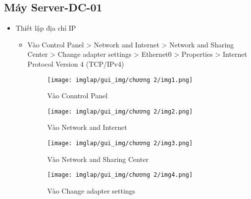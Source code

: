 \documentclass[13pt]{article}
\begin{document}
            \subsection{Máy Server-DC-01}
                \begin{itemize}
                    \item Thiết lập địa chỉ IP
                        \begin{itemize}
                            \item Vào Control Panel > Network and Internet > Network and Sharing Center > Change adapter settings > Ethernet0 > Properties > Internet Protocol Version 4 (TCP/IPv4)

                            \begin{figure}[H]
                                \centering
                                \texttt{[image: imglap/gui\_img/chương 2/img1.png]}
                                \caption{Vào Conntrol Panel}
                                \label{fig:enter-labe}
                            \end{figure}

                            \begin{figure}[H]
                                \centering
                                \texttt{[image: imglap/gui\_img/chương 2/img2.png]}
                                \caption{Vào Network and Internet}
                                \label{fig:enter-label}
                            \end{figure}

                            \begin{figure}[H]
                                \centering
                                \texttt{[image: imglap/gui\_img/chương 2/img3.png]}
                                \caption{Vào Network and Sharing Center}
                                \label{fig:enter-label}
                            \end{figure}

                            \begin{figure}[H]
                                \centering
                                \texttt{[image: imglap/gui\_img/chương 2/img4.png]}
                                \caption{Vào Change adapter settings}
                                \label{fig:enter-label}
                            \end{figure}


\end{itemize}
\end{itemize}
\end{document}
